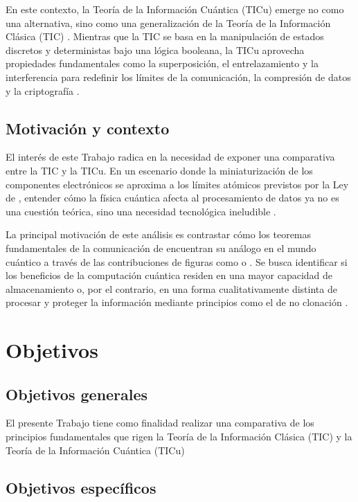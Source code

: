\documentclass[11pt,a4paper,spanish]{book}
\begin{document}
En este contexto, la Teoría de la Información Cuántica (TICu) emerge no como una alternativa, sino como una generalización de la Teoría de la Información Clásica (TIC) \citep{nielsen2010}. Mientras que la TIC se basa en la manipulación de estados discretos y deterministas bajo una lógica booleana, la TICu aprovecha propiedades fundamentales como la superposición, el entrelazamiento y la interferencia para redefinir los límites de la comunicación, la compresión de datos y la criptografía \citep{bennett1993, schumacher1995}.

\section{Motivación y contexto}

El interés de este Trabajo radica en la necesidad de exponer una comparativa entre la TIC y la TICu. En un escenario donde la miniaturización de los componentes electrónicos se aproxima a los límites atómicos previstos por la Ley de \cite{moore1965}, entender cómo la física cuántica afecta al procesamiento de datos ya no es una cuestión teórica, sino una necesidad tecnológica ineludible \citep{lloyd2000}. 

La principal motivación de este análisis es contrastar cómo los teoremas fundamentales de la comunicación de \citet{shannon1948} encuentran su análogo en el mundo cuántico a través de las contribuciones de figuras como \citet{schumacher1995} o \citet{holevo1973}. Se busca identificar si los beneficios de la computación cuántica residen en una mayor capacidad de almacenamiento o, por el contrario, en una forma cualitativamente distinta de procesar y proteger la información mediante principios como el de no clonación \citep{wootters1982}.

\chapter{Objetivos}

\section{Objetivos generales}

El presente Trabajo tiene como finalidad realizar una comparativa de los principios fundamentales que rigen la Teoría de la Información Clásica (TIC) y la Teoría de la Información Cuántica (TICu)

\section{Objetivos específicos}
\end{document}
